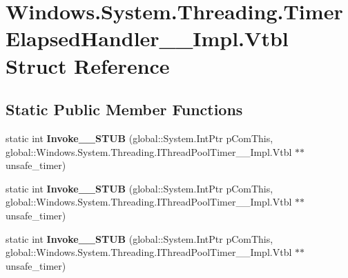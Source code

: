 \hypertarget{struct_windows_1_1_system_1_1_threading_1_1_timer_elapsed_handler_____impl_1_1_vtbl}{}\section{Windows.\+System.\+Threading.\+Timer\+Elapsed\+Handler\+\_\+\+\_\+\+Impl.\+Vtbl Struct Reference}
\label{struct_windows_1_1_system_1_1_threading_1_1_timer_elapsed_handler_____impl_1_1_vtbl}
\subsection*{Static Public Member Functions}
\begin{DoxyCompactItemize}
\item 
\mbox{\label{struct_windows_1_1_system_1_1_threading_1_1_timer_elapsed_handler_____impl_1_1_vtbl_abd4b7ca93614b3ff948fefa2bfc3da9d}} 
static int {\bfseries Invoke\+\_\+\+\_\+\+S\+T\+UB} (global\+::\+System.\+Int\+Ptr p\+Com\+This, global\+::\+Windows.\+System.\+Threading.\+I\+Thread\+Pool\+Timer\+\_\+\+\_\+\+Impl.\+Vtbl $\ast$$\ast$unsafe\+\_\+timer)
\item 
\mbox{\label{struct_windows_1_1_system_1_1_threading_1_1_timer_elapsed_handler_____impl_1_1_vtbl_abd4b7ca93614b3ff948fefa2bfc3da9d}} 
static int {\bfseries Invoke\+\_\+\+\_\+\+S\+T\+UB} (global\+::\+System.\+Int\+Ptr p\+Com\+This, global\+::\+Windows.\+System.\+Threading.\+I\+Thread\+Pool\+Timer\+\_\+\+\_\+\+Impl.\+Vtbl $\ast$$\ast$unsafe\+\_\+timer)
\item 
\mbox{\label{struct_windows_1_1_system_1_1_threading_1_1_timer_elapsed_handler_____impl_1_1_vtbl_abd4b7ca93614b3ff948fefa2bfc3da9d}} 
static int {\bfseries Invoke\+\_\+\+\_\+\+S\+T\+UB} (global\+::\+System.\+Int\+Ptr p\+Com\+This, global\+::\+Windows.\+System.\+Threading.\+I\+Thread\+Pool\+Timer\+\_\+\+\_\+\+Impl.\+Vtbl $\ast$$\ast$unsafe\+\_\+timer)
\item 
\mbox{\label{struct_windows_1_1_system_1_1_threading_1_1_timer_elapsed_handler_____impl_1_1_vtbl_abd4b7ca93614b3ff948fefa2bfc3da9d}} 
$$
\end{DoxyCompactItemize}

